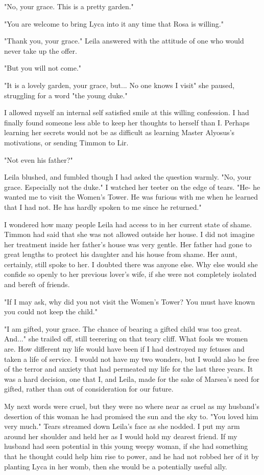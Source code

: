 \documentclass{article}
\begin{document}
"No, your grace. This is a pretty garden."

"You are welcome to bring Lyca into it any time that Rosa is willing."

"Thank you, your grace." Leila answered with the attitude of one who would never take up the offer.

"But you will not come."

"It is a lovely garden, your grace, but... No one knows I visit" she paused, struggling for a word "the young duke."

I allowed myself an internal self satisfied smile at this willing confession.  I had finally found someone less able to keep her thoughts to herself than I. Perhaps learning her secrets would not be as difficult as learning Master Alyosus's motivations, or sending Timmon to Lir.

"Not even his father?" 

Leila blushed, and fumbled though I had asked the question warmly. "No, your grace. Especially not the duke." I watched her teeter on the edge of tears. "He- he wanted me to visit the Women's Tower. He was furious with me when he learned that I had not. He has hardly spoken to me since he returned."

I wondered how many people Leila had access to in her current state of shame. Timmon had said that she was not allowed outside her house. I did not imagine her treatment inside her father's house was very gentle. Her father had gone to great lengths to protect his daughter and his house from shame. Her aunt, certainly, still spoke to her. I doubted there was anyone else. Why else would she confide so openly to her previous lover's wife, if she were not completely isolated and bereft of friends.

"If I may ask, why did you not visit the Women's Tower? You must have known you could not keep the child."

"I am gifted, your grace. The chance of bearing a gifted child was too great. And..." she trailed off, still teerering on that teary cliff. What fools we women are. How different my life would have been if I had destroyed my fetuses and taken a life of service. I would not have my two wonders, but I would also be free of the terror and anxiety that had permeated my life for the last three years. It was a hard decision, one that I, and Leila, made for the sake of Marsea's need for gifted, rather than out of consideration for our future.

My next words were cruel, but they were no where near as cruel as my husband's desertion of this woman he had promised the sun and the sky to. "You loved him very much."  Tears streamed down Leila's face as she nodded. I put my arm around her shoulder and held her as I would hold my dearest friend. If my husband had seen potential in this young weepy woman, if she had something that he thought could help him rise to power, and he had not robbed her of it by planting Lyca in her womb, then she would be a potentially useful ally.
\end{document}
